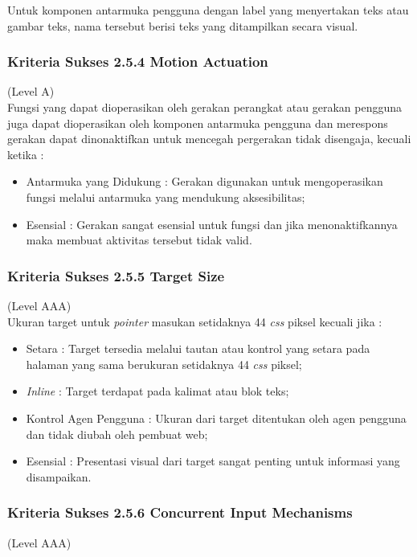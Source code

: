 Untuk komponen antarmuka pengguna dengan label yang menyertakan teks atau gambar teks, nama tersebut berisi teks yang ditampilkan secara visual.

\subsubsection{Kriteria Sukses 2.5.4 Motion Actuation}
\label{sec:kriteria_2.5.4}
(Level A) \\

Fungsi yang dapat dioperasikan oleh gerakan perangkat atau gerakan pengguna juga dapat dioperasikan oleh komponen antarmuka pengguna dan merespons gerakan dapat dinonaktifkan untuk mencegah pergerakan tidak disengaja, kecuali ketika :

\begin{itemize}
	\item Antarmuka yang Didukung : Gerakan digunakan untuk mengoperasikan fungsi melalui antarmuka yang mendukung aksesibilitas;
	\item Esensial : Gerakan sangat esensial untuk fungsi dan jika menonaktifkannya maka membuat aktivitas tersebut tidak valid.
\end{itemize}

\subsubsection{Kriteria Sukses 2.5.5 Target Size}
\label{sec:kriteria_2.5.5}
(Level AAA) \\

Ukuran target untuk \textit{pointer} masukan setidaknya 44 \textit{css} piksel kecuali jika :

\begin{itemize}
	\item Setara : Target tersedia melalui tautan atau kontrol yang setara pada halaman yang sama berukuran setidaknya 44 \textit{css} piksel;
	\item \textit{Inline} : Target terdapat pada kalimat atau blok teks;
	\item Kontrol Agen Pengguna : Ukuran dari target ditentukan oleh agen pengguna dan tidak diubah oleh pembuat web;
	\item Esensial : Presentasi visual dari target sangat penting untuk informasi yang disampaikan.
\end{itemize}

\subsubsection{Kriteria Sukses 2.5.6 Concurrent Input Mechanisms}
\label{sec:kriteria_2.5.6}
(Level AAA) \\

